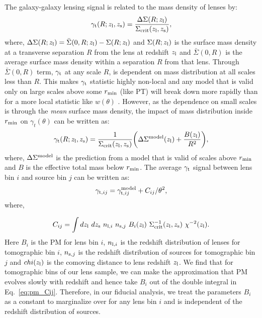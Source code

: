 \documentclass[fleqn,usenatbib]{mnras}
\newcommand{\gammat}{\ensuremath{\gamma_{t}(\theta)} }
\newcommand{\wtheta}{\ensuremath{w(\theta)} }
\begin{document}
        
    The galaxy-galaxy lensing signal is related to the mass density of lenses by:
    \begin{equation}
        \gamma_{\rm t}(R;z_{\rm l},z_{\rm s}) = \frac{\Delta \Sigma (R;z_{\rm l})}{\Sigma_{\rm crit} (z_{\rm l},z_{\rm s})},
    \end{equation}
    where, $\Delta \Sigma(R;z_{\rm l}) = \bar{\Sigma}(0,R; z_{\rm l}) - \Sigma(R;z_{\rm l})$ and $\Sigma(R;z_{\rm l})$ is the surface mass density at a transverse separation $R$ from the lens at redshift $z_{\rm l}$ and $\bar{\Sigma}(0,R)$ is the average surface mass density within a separation $R$ from that lens. Through $\bar{\Sigma}(0,R)$ term, $\gamma_{\rm t}$  at any scale $R$, is dependent on mass distribution at all scales less than $R$. This makes $\gamma_{\rm t}$ statistic highly non-local and any model that is valid only on large scales above some $r_{\rm min}$ (like PT) will break down more rapidly than for a more local statistic like \wtheta. However, as the dependence on small scales is through the \textit{mean} surface mass density, the impact of mass distribution inside $r_{\rm min}$ on \gammat can be written as:
    \begin{equation}
        \gamma_{\rm t}(R;z_{\rm l},z_{\rm s}) = \frac{1}{\Sigma_{\rm crit}(z_{\rm l},z_{\rm s})} \bigg(\Delta \Sigma^{\rm model}(z_{\rm l}) + \frac{B(z_{\rm l})}{R^2} \bigg),
    \end{equation}
    where, $\Delta \Sigma^{\rm model}$ is the prediction from a model that is valid of scales above $r_{\rm min}$ and $B$ is the effective total mass below $r_{\rm min}$.  The average $\gamma_{\rm t}$ signal between lens bin $i$ and source bin $j$ can be written as:
    \begin{equation}
        \gamma_{{\rm t},ij} = \gamma^{\rm model}_{{\rm t},ij} + C_{ij}/\theta^2,
    \end{equation}
    where,
    
    \begin{equation}\label{eq:pm_Cij}
        C_{ij} = \int dz_{\rm l} \ dz_{\rm s} \ n_{{\rm l},i} \ n_{{\rm s},j} \ B_i(z_{\rm l}) \ \Sigma^{-1}_{\rm crit}(z_{\rm l},z_{\rm s}) \ \chi^{-2}(z_{\rm l}).
    \end{equation}
    Here $B_i$ is the PM for lens bin $i$, $n_{{\rm l},i}$ is the redshift distribution of lenses for tomographic bin $i$, $n_{{\rm s},j}$ is the redshift distribution of sources for tomographic bin $j$ and $chi(z_{\rm l})$ is the comoving distance to lens redshift $z_{\rm l}$. We find that for tomographic bins of our lens sample, we can make the approximation that PM evolves slowly with redshift and hence take $B_i$ out of the double integral in Eq.~\ref{eq:pm_Cij}. Therefore, in our fiducial analysis, we treat the parameters $B_i$ as a constant to marginalize over for any lens bin $i$ and is independent of the redshift distribution of sources. 
    
\end{document}
